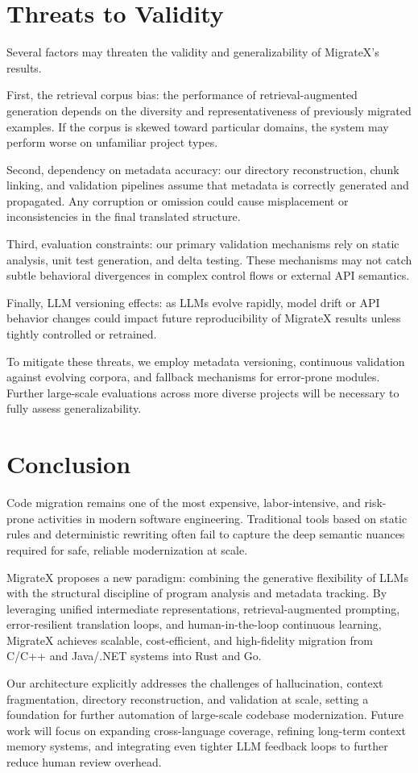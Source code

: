 \documentclass[twocolumn]{article}
\begin{document}
\section{Threats to Validity}

Several factors may threaten the validity and generalizability of MigrateX's results.

First, the retrieval corpus bias: the performance of retrieval-augmented generation depends on the diversity and representativeness of previously migrated examples. If the corpus is skewed toward particular domains, the system may perform worse on unfamiliar project types.

Second, dependency on metadata accuracy: our directory reconstruction, chunk linking, and validation pipelines assume that metadata is correctly generated and propagated. Any corruption or omission could cause misplacement or inconsistencies in the final translated structure.

Third, evaluation constraints: our primary validation mechanisms rely on static analysis, unit test generation, and delta testing. These mechanisms may not catch subtle behavioral divergences in complex control flows or external API semantics.

Finally, LLM versioning effects: as LLMs evolve rapidly, model drift or API behavior changes could impact future reproducibility of MigrateX results unless tightly controlled or retrained.

To mitigate these threats, we employ metadata versioning, continuous validation against evolving corpora, and fallback mechanisms for error-prone modules. Further large-scale evaluations across more diverse projects will be necessary to fully assess generalizability.


\section{Conclusion}

Code migration remains one of the most expensive, labor-intensive, and risk-prone activities in modern software engineering. Traditional tools based on static rules and deterministic rewriting often fail to capture the deep semantic nuances required for safe, reliable modernization at scale.

MigrateX proposes a new paradigm: combining the generative flexibility of LLMs with the structural discipline of program analysis and metadata tracking. By leveraging unified intermediate representations, retrieval-augmented prompting, error-resilient translation loops, and human-in-the-loop continuous learning, MigrateX achieves scalable, cost-efficient, and high-fidelity migration from C/C++ and Java/.NET systems into Rust and Go.

Our architecture explicitly addresses the challenges of hallucination, context fragmentation, directory reconstruction, and validation at scale, setting a foundation for further automation of large-scale codebase modernization. Future work will focus on expanding cross-language coverage, refining long-term context memory systems, and integrating even tighter LLM feedback loops to further reduce human review overhead.



\end{document}
